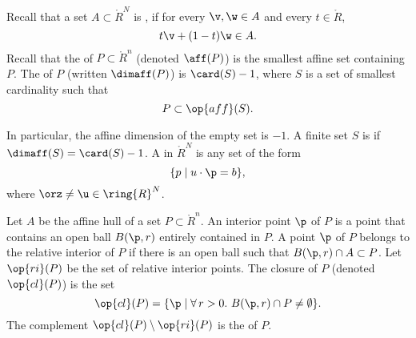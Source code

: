 \begin{definition}\label{def:affine}
Recall that a set $A\subset\ring{R}^N$ is , if for
every $\v,\w\in A$ and every $t \in \ring{R}$, 
\begin{displaymath}
  t \v + (1-t) \w \in A.
\end{displaymath}
Recall that
the  of $P\subset\ring{R}^n$ (denoted $\aff(P)$) 
is the smallest affine set
containing $P$.  The  of $P$ (written $\dimaff(P)$) is
$\card(S)-1$, where $S$ is a set of smallest cardinality such that
\begin{displaymath}
P \subset \op{aff}(S).
\end{displaymath}
\end{definition}
In particular, the affine dimension of the empty set is $-1$.
A finite set $S$ is  if $\dimaff(S) = \card(S)-1$.
A  in $\ring{R}^N$ is any set of the form
\begin{displaymath}
\{p\mid u\cdot \p = b\},
\end{displaymath}
where $\orz\ne\u\in\ring{R}^N$.
%
%



\begin{definition}
Let
$A$ be the affine hull of a set $P\subset\ring{R}^n$.  An interior
point $\p$ of $P$ is a point that contains an open ball $B(\p,r)$
entirely contained in $P$.  A point $\p$ of $P$ belongs to the
relative interior of $P$ if there is an open ball such that $B(\p,r)
\cap A\subset P$.  Let $\op{ri}(P)$ be the set of relative interior
points.  The closure of $P$ (denoted $\op{cl}(P)$) is the set
\begin{displaymath}
\op{cl}(P) = \{\p \mid \forall\,r >0.~ B(\p,r) \cap P \ne \emptyset\}.
\end{displaymath}
The complement $\op{cl}(P)\setminus \op{ri}(P)$ is the
 of $P$.
\end{definition}
%
%
%
%
%
%
%

